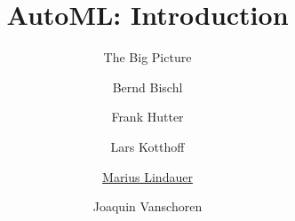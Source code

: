 




\title[AutoML: Big Picture]{AutoML: Introduction}
\subtitle{The Big Picture}
\author[Marius Lindauer]{Bernd Bischl \and Frank Hutter \and Lars Kotthoff\newline \and \underline{Marius Lindauer} \and Joaquin Vanschoren}
\institute{}
\date{}





	
	\maketitle
	



